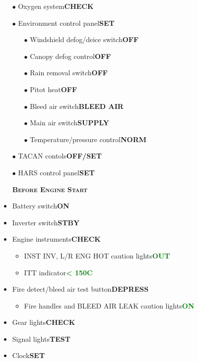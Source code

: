 \documentclass[a4paper,12pt,dvipsnames]{letter}
\newcommand{\button}[1]{\textbf{#1}}
\newcommand{\degC}{\textdegree{}C}
\newcommand{\ok}[1]{\textcolor{Green}{\textbf{#1}}}
\newcommand{\myHead}[1]{{\LARGE\textsc{\textbf{#1}}}}
\newcommand{\bi}{\textcolor{ProcessBlue}{$\bullet$\;}}
\begin{document}
{\begin{itemize}
\begin{itemize}
  \item[\bi] STEER PT knob\dotfill\button{MISSION}
 \end{itemize}
 \item[\bi] Oxygen system\dotfill\button{CHECK}
 \item[\bi] Environment control panel\dotfill\button{SET}
 \begin{itemize}
  \item[\bi] Windshield defog/deice switch\dotfill\button{OFF}
  \item[\bi] Canopy defog control\dotfill\button{OFF}
  \item[\bi] Rain removal switch\dotfill\button{OFF}
  \item[\bi] Pitot heat\dotfill\button{OFF}
  \item[\bi] Bleed air switch\dotfill\button{BLEED AIR}
  \item[\bi] Main air switch\dotfill\button{SUPPLY}
  \item[\bi] Temperature/pressure control\dotfill\button{NORM}
 \end{itemize}
 \item[\bi] TACAN contols\dotfill\button{OFF/SET}
 \item[\bi] HARS control panel\dotfill\button{SET}
\end{itemize}
%
\newpage
\begin{itemize}
 \item[] \myHead{Before Engine Start}
 \item Battery switch\dotfill\button{ON}
 \item Inverter switch\dotfill\button{STBY}
 \item Engine instruments\dotfill\button{CHECK}
 \begin{itemize}
  \item INST INV, L/R ENG HOT caution lights\dotfill\ok{OUT}
  \item ITT indicator\dotfill\ok{< 150\degC}
 \end{itemize}
 \item Fire detect/bleed air test button\dotfill\button{DEPRESS}
 \begin{itemize}
  \item Fire handles and BLEED AIR LEAK caution lights\dotfill\ok{ON}
 \end{itemize}
 \item Gear lights\dotfill\button{CHECK}
 \item Signal lights\dotfill\button{TEST}
 \item Clock\dotfill\button{SET}

\end{itemize}}
\end{document}
